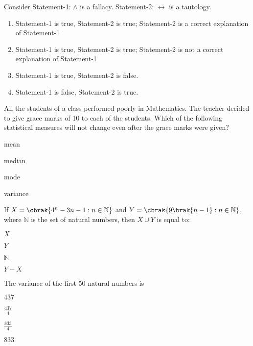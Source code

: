     \item Consider \newline
 Statement-1:  $\land$  is a fallacy. \newline
Statement-2:  $\leftrightarrow$  is a tautology.

    \hfill{}
    \begin{enumerate}
        \item Statement-1 is true, Statement-2 is true; Statement-2 is a correct explanation of Statement-1
        \item Statement-1 is true, Statement-2 is true; Statement-2 is not a correct explanation of Statement-1
        \item Statement-1 is true, Statement-2 is false.
        \item Statement-1 is false, Statement-2 is true.
    \end{enumerate}
    
    \item All the students of a class performed poorly in Mathematics. The teacher decided to give grace marks of 10 to each of the students. Which of the following statistical measures will not change even after the grace marks were given?
    
    \hfill{}
    \begin{enumerate}
    \begin{multicols}{2}
        \item mean
        \item median
        \item mode
        \item variance
    \end{multicols}
    \end{enumerate}
    
    \item If $X = \cbrak{4^n - 3n - 1 : n \in \mathbb{N}}$ and $Y = \cbrak{9 \brak{n - 1} : n \in \mathbb{N}}$, where $\mathbb{N}$ is the set of natural numbers, then $X \cup Y$ is equal to:
    
    \hfill{}
    \begin{enumerate}
    \begin{multicols}{4}
        \item $X$
        \item $Y$
        \item $\mathbb{N}$
        \item $Y - X$
    \end{multicols}
    \end{enumerate}
    
    \item The variance of the first 50 natural numbers is
    
    \hfill{}
    \begin{enumerate}
    \begin{multicols}{4}
        \item $437$
        \item $\frac{437}{4}$
        \item $\frac{833}{4}$
        \item $833$
    \end{multicols}
    \end{enumerate}
